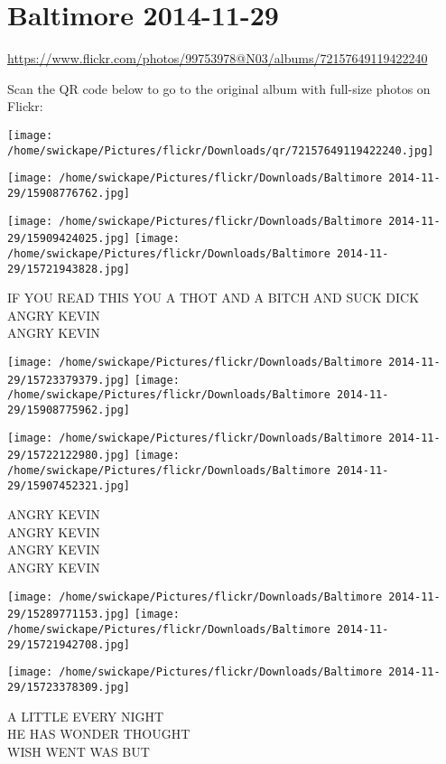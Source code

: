 \documentclass[10pt,letterpaper]{article}
\title{}
\author{}
\date{}
\begin{document}
\section*{Baltimore 2014-11-29}

\url{https://www.flickr.com/photos/99753978@N03/albums/72157649119422240}

Scan the QR code below to go to the original album with full-size photos on Flickr:

\texttt{[image: /home/swickape/Pictures/flickr/Downloads/qr/72157649119422240.jpg]}
\pagebreak

\texttt{[image: /home/swickape/Pictures/flickr/Downloads/Baltimore 2014-11-29/15908776762.jpg]}

\vspace{0.25in}
\texttt{[image: /home/swickape/Pictures/flickr/Downloads/Baltimore 2014-11-29/15909424025.jpg]}
\texttt{[image: /home/swickape/Pictures/flickr/Downloads/Baltimore 2014-11-29/15721943828.jpg]}

IF YOU READ THIS YOU A THOT AND A BITCH AND SUCK DICK\\
ANGRY KEVIN\\
ANGRY KEVIN
\pagebreak

\texttt{[image: /home/swickape/Pictures/flickr/Downloads/Baltimore 2014-11-29/15723379379.jpg]}
\texttt{[image: /home/swickape/Pictures/flickr/Downloads/Baltimore 2014-11-29/15908775962.jpg]}

\texttt{[image: /home/swickape/Pictures/flickr/Downloads/Baltimore 2014-11-29/15722122980.jpg]}
\texttt{[image: /home/swickape/Pictures/flickr/Downloads/Baltimore 2014-11-29/15907452321.jpg]}

ANGRY KEVIN\\
ANGRY KEVIN\\
ANGRY KEVIN\\
ANGRY KEVIN
\pagebreak

\texttt{[image: /home/swickape/Pictures/flickr/Downloads/Baltimore 2014-11-29/15289771153.jpg]}
\texttt{[image: /home/swickape/Pictures/flickr/Downloads/Baltimore 2014-11-29/15721942708.jpg]}

\vspace{0.25in}
\texttt{[image: /home/swickape/Pictures/flickr/Downloads/Baltimore 2014-11-29/15723378309.jpg]}

A LITTLE EVERY NIGHT\\
HE HAS WONDER THOUGHT\\
WISH WENT WAS BUT
\pagebreak
\end{document}

